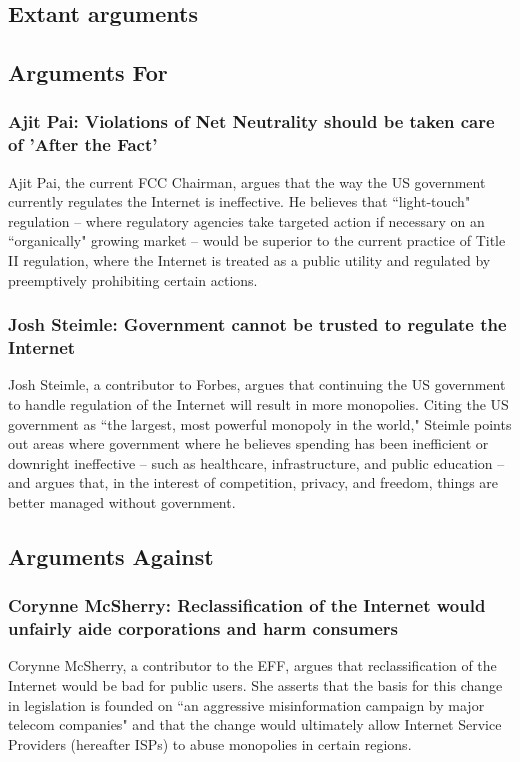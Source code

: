 \documentclass[12pt]{article}
\begin{document}
\begin{multicols}{2}
\section{Extant arguments}

\subsection{Arguments For}
\subsubsection{Ajit Pai: Violations of Net Neutrality should be taken care of 'After the Fact'}
Ajit Pai, the current FCC Chairman, argues that the way the US government currently regulates the Internet is ineffective. He believes that ``light-touch" regulation -- where regulatory agencies take targeted action if necessary on an ``organically" growing market -- would be superior to the current practice of Title II regulation, where the Internet is treated as a public utility and regulated by preemptively prohibiting certain actions.\cite{npr-pai-makes-case, pbs-pai-makes-case}
\subsubsection{Josh Steimle: Government cannot be trusted to regulate the Internet}
Josh Steimle, a contributor to Forbes, argues that continuing the US government to handle regulation of the Internet will result in more monopolies. Citing the US government as ``the largest, most powerful monopoly in the world," Steimle points out areas where government where he believes spending has been inefficient or downright ineffective -- such as healthcare, infrastructure, and public education -- and argues that, in the interest of competition, privacy, and freedom, things are better managed without government.\cite{forbes-libertarian}

\subsection{Arguments Against}
\subsubsection{Corynne McSherry: Reclassification of the Internet would unfairly aide corporations and harm consumers}
Corynne McSherry, a contributor to the EFF, argues that reclassification of the Internet would be bad for public users. She asserts that the basis for this change in legislation is founded on ``an aggressive misinformation campaign by major telecom companies" and that the change would ultimately allow Internet Service Providers (hereafter ISPs) to abuse monopolies in certain regions.\cite{eff-pro-net}


\end{multicols}
\end{document}

